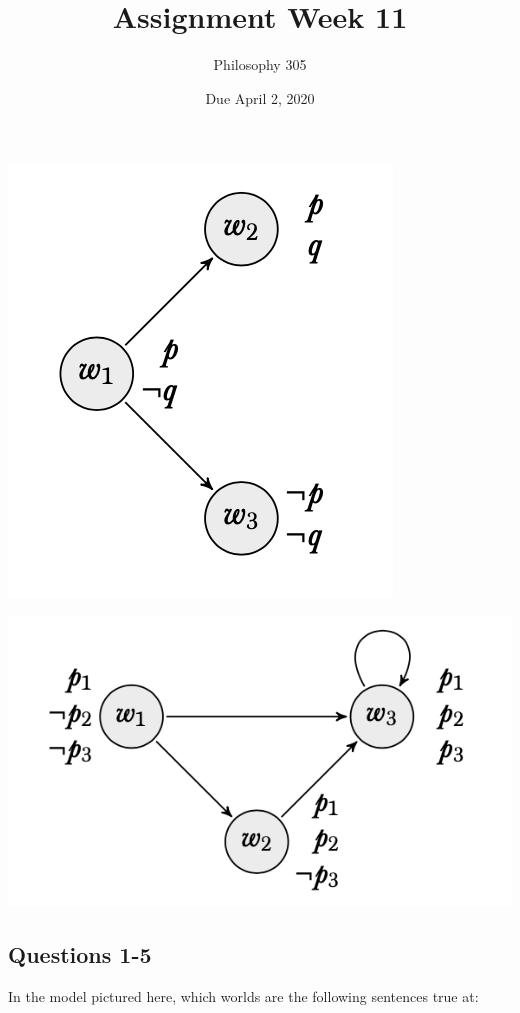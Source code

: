 \documentclass[
  11pt,
  twocolumn]{article}
\title{Assignment Week 11}
\author{Philosophy 305}
\date{Due April 2, 2020}
\begin{document}
\maketitle

\includegraphics{11_first_picture.png}

\includegraphics{11_second_picture.png}

\newpage

\hypertarget{questions-1-5}{%
\subsection{Questions 1-5}\label{questions-1-5}}

In the model pictured here, which worlds are the following sentences
true at:
\end{document}
